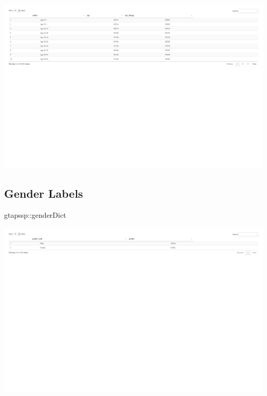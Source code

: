 \documentclass[
  letterpaper,
  DIV=11,
  numbers=noendperiod]{scrartcl}
\newenvironment{Shaded}{}{}
\newcommand{\NormalTok}[1]{\textcolor[rgb]{0.12,0.11,0.11}{#1}}
\newcommand{\SpecialCharTok}[1]{\textcolor[rgb]{0.24,0.68,0.91}{#1}}
\begin{document}
\includegraphics{index_files/figure-pdf/unnamed-chunk-16-1.pdf}

\subsection{Gender Labels}

\begin{Shaded}
\begin{Highlighting}[]
\NormalTok{gtapssp}\SpecialCharTok{::}\NormalTok{genderDict}
\end{Highlighting}
\end{Shaded}

\includegraphics{index_files/figure-pdf/unnamed-chunk-18-1.pdf}
\end{document}
